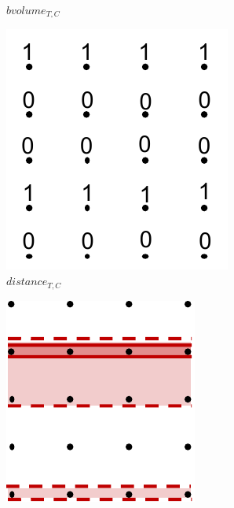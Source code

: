 \begin{figure}[!t]
\begin{subfigure}{0.18\linewidth}
\caption{$bvolume_{T,C}$}
\label{}
\end{subfigure}
\hspace{2mm}
\begin{subfigure}{0.18\linewidth}
\includegraphics[width=\linewidth]{Images/distanceTC.pdf}
\caption{$distance_{T,C}$}
\label{}
\end{subfigure}
\hspace{2mm}
\begin{subfigure}{0.18\linewidth}
\includegraphics[width=\linewidth]{Images/zlsT_fclsTC.pdf}

\end{subfigure}
\end{figure}
